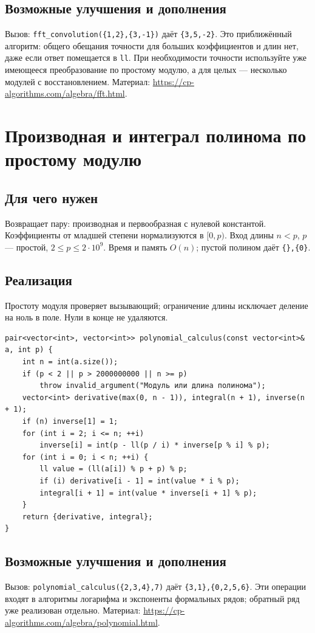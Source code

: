 \subsection*{Возможные улучшения и дополнения}
Вызов: \texttt{fft\_convolution(\{1,2\},\{3,-1\})} даёт \texttt{\{3,5,-2\}}.
Это приближённый алгоритм: общего обещания точности для больших
коэффициентов и длин нет, даже если ответ помещается в \texttt{ll}.
При необходимости точности используйте уже имеющееся преобразование по
простому модулю, а для целых --- несколько модулей с восстановлением.
Материал: \url{https://cp-algorithms.com/algebra/fft.html}.

\clearpage

\fi
\iffalse
\section{Производная и интеграл полинома по простому модулю}
\subsection*{Для чего нужен}
Возвращает пару: производная и первообразная с нулевой константой.
Коэффициенты от младшей степени нормализуются в $[0,p)$.
Вход длины $n<p$, $p$ --- простой, $2\le p\le 2\cdot10^9$.
Время и память $O(n)$; пустой полином даёт \texttt{\{\},\{0\}}.
\subsection*{Реализация}
Простоту модуля проверяет вызывающий; ограничение длины исключает
деление на ноль в поле. Нули в конце не удаляются.
\begin{lstlisting}[name=supplement_calculus]
pair<vector<int>, vector<int>> polynomial_calculus(const vector<int>& a, int p) {
    int n = int(a.size());
    if (p < 2 || p > 2000000000 || n >= p)
        throw invalid_argument("Модуль или длина полинома");
    vector<int> derivative(max(0, n - 1)), integral(n + 1), inverse(n + 1);
    if (n) inverse[1] = 1;
    for (int i = 2; i <= n; ++i)
        inverse[i] = int(p - ll(p / i) * inverse[p % i] % p);
    for (int i = 0; i < n; ++i) {
        ll value = (ll(a[i]) % p + p) % p;
        if (i) derivative[i - 1] = int(value * i % p);
        integral[i + 1] = int(value * inverse[i + 1] % p);
    }
    return {derivative, integral};
}
\end{lstlisting}
\subsection*{Возможные улучшения и дополнения}
Вызов: \texttt{polynomial\_calculus(\{2,3,4\},7)} даёт
\texttt{\{3,1\},\{0,2,5,6\}}. Эти операции входят в алгоритмы
логарифма и экспоненты формальных рядов; обратный ряд уже реализован отдельно.
Материал: \url{https://cp-algorithms.com/algebra/polynomial.html}.

